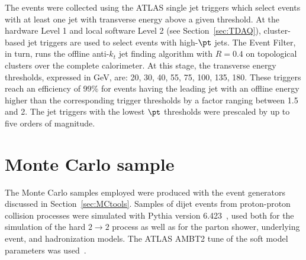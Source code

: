 The events were collected  using the ATLAS single jet triggers which select events with at least one jet with transverse energy above a given threshold.  At the hardware Level 1 and local software Level 2 (see Section~\ref{sec:TDAQ}), cluster-based jet triggers are used to select events with high-$\pt$ jets. The Event Filter, in turn, runs  the offline anti-$k_t$ jet finding algorithm with $R = 0.4$ on topological clusters over the complete calorimeter.  At this stage, the transverse energy thresholds, expressed in GeV, are: 20, 30, 40, 55, 75, 100, 135, 180. These triggers reach an efficiency of 99\% for events having the leading jet with an offline energy higher than the corresponding trigger thresholds by a factor ranging between 1.5 and 2. %
 The jet triggers with the lowest $\pt$ thresholds were prescaled by up to five orders of magnitude. %




\section{Monte Carlo sample}\label{sec:analysis}

The Monte Carlo samples employed were produced with the event generators discussed in Section~\ref{sec:MCtools}. Samples of dijet events from proton-proton collision processes were simulated with {\sc Pythia} version 6.423~\cite{PYTHIA6}, used both for the simulation of the hard $2\rightarrow 2$ process as well as for the parton shower, underlying event, and hadronization models. The ATLAS AMBT2 tune of the soft model parameters was used~\cite{Pythia_MC11tune}.

